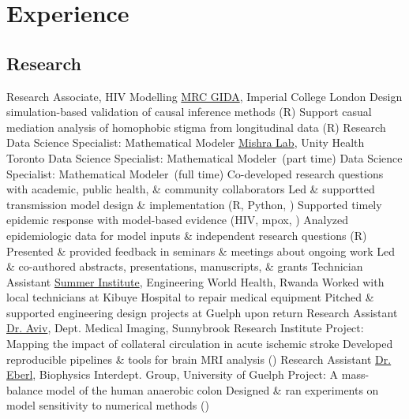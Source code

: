 \section{Experience}\twodate
\subsection{Research}
  {Research Associate, HIV Modelling}
  {\href{https://www.imperial.ac.uk/mrc-global-infectious-disease-analysis}{MRC GIDA}, Imperial College London}
  \bullet Design simulation-based validation of causal inference methods (R)
  \bullet Support casual mediation analysis of homophobic stigma from longitudinal data (R)
  {Research Data Science Specialist: Mathematical Modeler}
  {\href{http://mishra-lab.ca}{Mishra Lab}, Unity Health Toronto}
  {Data Science Specialist: Mathematical Modeler~\textnormal{(part time)}}{}
  {Data Science Specialist: Mathematical Modeler~\textnormal{(full time)}}{}
  \bullet Co-developed research questions with academic, public health, \& community collaborators
  \bullet Led \& supportted transmission model design \& implementation (R, Python, \matlab)
  \bullet Supported timely epidemic response with model-based evidence (HIV, mpox, \covid)
  \bullet Analyzed epidemiologic data for model inputs \& independent research questions (R)
  \bullet Presented \& provided feedback in seminars \& meetings about ongoing work
  \bullet Led \& co-authored abstracts, presentations, manuscripts, \& grants
  {Technician Assistant}
  {\href{https://www.ewh.org/the-institutes/summer-institute-programs}{Summer Institute}, Engineering World Health, Rwanda}
  \bullet Worked with local technicians at Kibuye Hospital to repair medical equipment
  \bullet Pitched \& supported engineering design projects at Guelph upon return
  {Research Assistant}
  {\href{https://www.uottawa.ca/brain/people/aviv-richard}{Dr. Aviv}, Dept. Medical Imaging, Sunnybrook Research Institute}
  \bullet Project: Mapping the impact of collateral circulation in acute ischemic stroke
  \bullet Developed reproducible pipelines \& tools for brain MRI analysis (\matlab)
  {Research Assistant}
  {\href{https://www.heberl.uoguelph.ca}{Dr. Eberl}, Biophysics Interdept. Group, University of Guelph}
  \bullet Project: A mass-balance model of the human anaerobic colon
  \bullet Designed \& ran experiments on model sensitivity to numerical methods (\matlab)
\clearpage %
